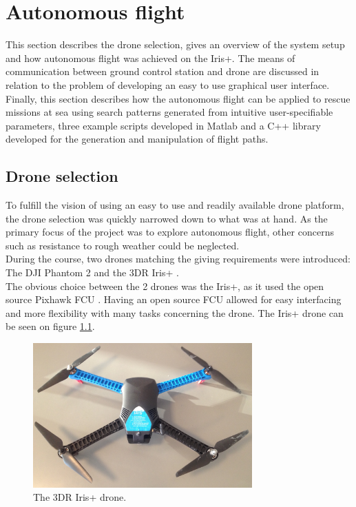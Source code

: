 \chapter{Autonomous flight}
\label{chap:autonomousflight}
This section describes the drone selection, gives an overview of the system setup
and how autonomous flight was achieved on the Iris+.
The means of communication between ground control station and drone are discussed in relation
to the problem of developing an easy to use graphical user interface.
Finally, this section describes how the autonomous flight can be applied to rescue
missions at sea using search patterns generated from intuitive user-specifiable parameters,
three example scripts developed in Matlab and a C++ library developed for the generation and manipulation of flight paths.

\section{Drone selection}
\label{sec:droneselection}
To fulfill the vision of using an easy to use and readily available drone platform,
the drone selection was quickly narrowed down to what was at hand. As the primary focus of the project was to
explore autonomous flight, other concerns such as resistance to rough weather could be neglected.
\\During the course, two drones matching the giving requirements were introduced: The DJI Phantom 2
\cite{Ref:dji} and the 3DR Iris+ \cite{Ref:3dr}.\\
The obvious choice between the 2 drones was the Iris+, as it used the open source Pixhawk FCU
\cite{Ref:px4}. Having an open source FCU allowed for easy interfacing and more flexibility with
many tasks concerning the drone. The Iris+ drone can be seen on figure \ref{fig:iris}.
\\

\begin{figure}[H]
  \centering
    \includegraphics[width=0.75\textwidth]{./Images/iris}
  \caption{The 3DR Iris+ drone.}
  \label{fig:iris}
\end{figure}

